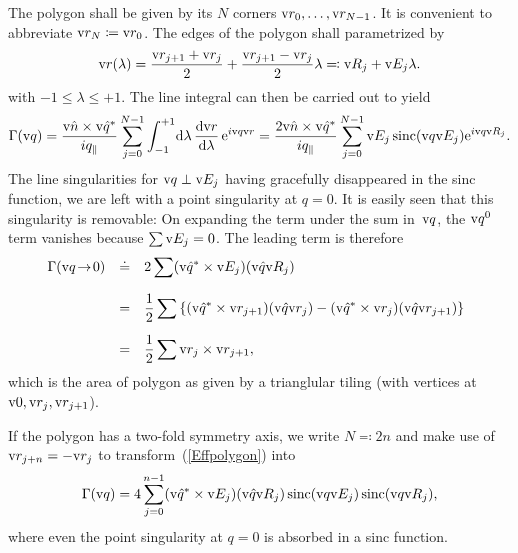 The polygon shall be given by its $N$ corners $\text{v}{r}_0,\ldots,\text{v}{r}_{N-1}$.
It is convenient to abbreviate $\text{v}{r}_N\coloneqq\text{v}{r}_0$.
The edges of the polygon shall parametrized by
\begin{equation}
  \text{v}{r}(\lambda) = \frac{\text{v}{r}_{j+1}+\text{v}{r}_j}{2} + \frac{\text{v}{r}_{j+1}-\text{v}{r}_j}{2} \lambda
  \eqqcolon \text{v}{R}_j + \text{v}{E}_j\lambda.
\end{equation}
with $-1\le\lambda\le+1$.
The line integral can then be carried out to yield
\begin{equation}\label{Effpolygon}
    \Gamma(\text{v}{q}) = \displaystyle \frac{\text{v}{\hat n}\times\text{v}{\hat q}^*}{iq_\parallel} \sum_{j=0}^{N-1}
              \int_{-1}^{+1}\!\text{d}\lambda\, \frac{\text{d}\text{v}{r}}{\text{d}\lambda}\,\text{e}^{i\text{v}{q}\text{v}{r}}
          = \displaystyle \frac{2\text{v}{\hat n}\times\text{v}{\hat q}^*}{iq_\parallel} \sum_{j=0}^{N-1}
              \text{v}{E}_j \operatorname{sinc}(\text{v}{q}\text{v}{E}_j) \text{e}^{i\text{v}{q}\text{v}{R}_j}.
\end{equation}
The line singularities for $\text{v}{q}\perp\text{v}{E}_j$ having gracefully disappeared in the
sinc function,
we are left with a point singularity at $q=0$.
It is easily seen that this singularity is removable:
On expanding the term under the sum in~$\text{v}{q}$,
the $\text{v}{q}^0$ term vanishes because $\sum\text{v}{E}_j=0$.
The leading term is therefore
\begin{equation}
  \begin{array}{@{}lcl}
  \Gamma(\q\!\to\!0) &\doteq& \displaystyle 2\sum (\v{\hat q^*}\times\E_j) (\v{\hat q}\R_j)\\[3ex]
    &=&\displaystyle \frac{1}{2}\sum \left\{
        (\v{\hat q^*}\times\r_{j+1})(\v{\hat q}\r_j) -
        (\v{\hat q^*}\times\r_j)(\v{\hat q}\r_{j+1})
      \right\}\\[3ex]
    &=&\displaystyle \frac{1}{2}\sum \r_j\times\r_{j+1},
  \end{array}
\end{equation}
which is the area of polygon
as given by a trianglular tiling (with vertices at $\text{v}{0},\text{v}{r}_j,\text{v}{r}_{j+1}$).

If the polygon has a two-fold symmetry axis, we write $N\eqqcolon2n$
and make use of $\text{v}{r}_{j+n}=-\text{v}{r}_j$ to transform~(\ref{Effpolygon}) into
\begin{equation}\label{Eff2ngon}
    \Gamma(\text{v}{q}) = \displaystyle 4 \sum_{j=0}^{n-1}
              (\text{v}{\hat q^*}\times\text{v}{E}_j) (\text{v}{\hat q}\text{v}{R}_j) \operatorname{sinc}(\text{v}{q}\text{v}{E}_j) \operatorname{sinc}(\text{v}{q}\text{v}{R}_j),
\end{equation}
where even the point singularity at $q=0$ is absorbed in a sinc function.
%
%

